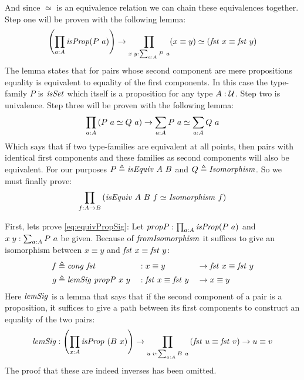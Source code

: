 And since $\simeq$ is an equivalence relation we can chain these equivalences
together. Step one will be proven with the following lemma:
%
\begin{align}
  \label{eq:equivPropSig}
\left(\prod_{a \tp A} \isProp (P\ a)\right) \to \prod_{x\;y \tp \sum_{a \tp A} P\ a} (x \equiv y) \simeq (\fst\ x \equiv \fst\ y)
\end{align}
%
The lemma states that for pairs whose second component are mere propositions
equality is equivalent to equality of the first components. In this case the
type-family $P$ is $\isSet$ which itself is a proposition for any type $A \mathrel{:}
\mathcal{U}$. Step two is univalence. Step three will be proven with the following
lemma:
%
\begin{align}
  \label{eq:equivSig}
\prod_{a \mathrel{:} A} \left( P\ a \simeq Q\ a \right) \to \sum_{a \mathrel{:} A} P\ a \simeq \sum_{a \mathrel{:} A} Q\ a
\end{align}
%
Which says that if two type-families are equivalent at all points, then pairs
with identical first components and these families as second components will
also be equivalent. For our purposes $P \defeq \isEquiv\ A\ B$ and $Q \defeq
\Isomorphism$. So we must finally prove:
%
\begin{align}
  \label{eq:equivIso}
\prod_{f \tp A \to B} \left( \isEquiv\ A\ B\ f \simeq \Isomorphism\ f \right)
\end{align}

First, lets prove \ref{eq:equivPropSig}: Let $propP \tp \prod_{a \tp A} \isProp (P\ a)$ and $x\;y \mathrel{:} \sum_{a \mathrel{:} A} P\ a$ be given. Because
of $\mathit{fromIsomorphism}$ it suffices to give an isomorphism between
$x \equiv y$ and $\fst\ x \equiv \fst\ y$:
%
\begin{equation*}
\begin{aligned}
  f & \defeq \congruence\ \fst
    && \tp x       \equiv y       && \to \fst\ x \equiv \fst\ y \\
  g & \defeq \var{lemSig}\ \var{propP}\ x\ y
    && \tp \fst\ x \equiv \fst\ y && \to x       \equiv y
\end{aligned}
\end{equation*}
%
 Here $\mathit{lemSig}$ is
a lemma that says that if the second component of a pair is a proposition, it
suffices to give a path between its first components to construct an equality of
the two pairs:
%
\begin{align*}
\var{lemSig} \tp \left( \prod_{x \tp A} \isProp\ (B\ x) \right) \to
\prod_{u\; v \tp \sum_{a \tp A} B\ a}
  \left( \fst\ u \equiv \fst\ v \right) \to u \equiv v
\end{align*}
%
The proof that these are indeed inverses has been omitted. \QED

